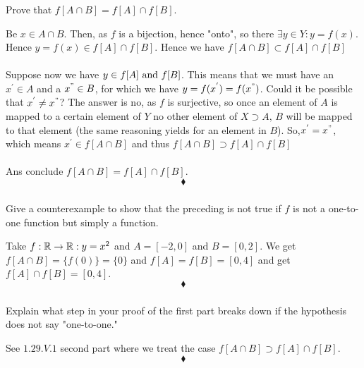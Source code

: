 \subsubsection{}
\begin{tcolorbox}
Prove that $f[A \cap B] = f[A] \cap  f[B]$.
\end{tcolorbox}
Be $x\in A\cap B$. Then, as $f$ is a bijection, hence "onto", so there $\exists y\in Y: y=f(x)$. Hence $y=f(x)\in f[A] \cap  f[B]$. Hence we have $f[A \cap B] \subset f[A] \cap  f[B]$\\\\
Suppose now we have $y\in f[A]\text{ and } f[B]$. This means that we must have an $x^{'}\in A$ and a $x^{"}\in B$, for which we have $y=f(x^{'})=f(x^{"})$. Could it be possible that $ x^{'}\neq x^{"}$? The answer is no, as $f$ is surjective, so once an element of $A$ is mapped to a certain element of $Y$ no other element of $X\supset A,\, B$ will be mapped to that element (the same reasoning yields  for an element in $B$). So,$ x^{'}= x^{"}$, which means $x^{'}\in f[A\cap B]$ and thus $f[A \cap B] \supset f[A] \cap  f[B]$\\\\

Ans conclude $f[A \cap B] = f[A] \cap  f[B]$.
$$\blacklozenge$$

\subsubsection{}
\begin{tcolorbox}
Give a counterexample to show that the preceding is not true if $f$ is not a one-to-one function but simply a function. 
\end{tcolorbox}
$$ $$
Take $f: \mathbb{R}\rightarrow \mathbb{R}: y=x^2$ and $A=[-2,0]$ and $B= [0,2]$. We get $f[A \cap B] = \{f(0)\}=\{0\}$ and  $f[A]= f[B]=[0,4]$ and get $f[A] \cap  f[B]=[0,4]$.
$$\blacklozenge$$

\subsubsection{}
\begin{tcolorbox}
Explain what step in your proof of the first part breaks down if the hypothesis does not say "one-to-one." 
\end{tcolorbox}
See $1.29.V.1$ second part where we treat the case $f[A \cap B] \supset f[A] \cap  f[B]$.
$$\blacklozenge$$
\newpage

\renewcommand{\thesubsection}{\thesection.\RomanNumeralCaps{6}}
